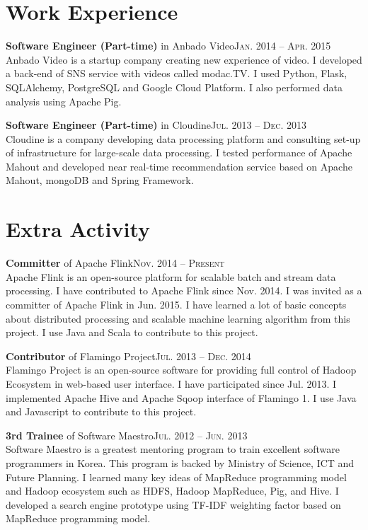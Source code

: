 \documentclass[11pt,a4paper]{article}
\renewenvironment{itemize}{
  \begin{list}{}{
    \setlength{\leftmargin}{1.5em}
    \setlength{\itemsep}{0.5em}
    \setlength{\parskip}{0pt}
    \setlength{\parsep}{0.25em}
  }
}{
  \end{list}
}
\begin{document}
\section*{Work Experience}
\begin{itemize}
  \item \textbf{Software Engineer (Part-time)} in Anbado Video\hfill\textsc{Jan. 2014 -- Apr. 2015}\\
        Anbado Video is a startup company creating new experience of video. I developed a back-end of SNS service with videos called modac.TV. I used Python, Flask, SQLAlchemy, PostgreSQL and Google Cloud Platform. I also performed data analysis using Apache Pig.
  \item \textbf{Software Engineer (Part-time)} in Cloudine\hfill\textsc{Jul. 2013 -- Dec. 2013}\\
        Cloudine is a company developing data processing platform and consulting set-up of infrastructure for large-scale data processing. I tested performance of Apache Mahout and developed near real-time recommendation service based on Apache Mahout, mongoDB and Spring Framework.
\end{itemize}

\section*{Extra Activity}
\begin{itemize}
  \item \textbf{Committer} of Apache Flink\hfill\textsc{Nov. 2014 -- Present}\\
        Apache Flink is an open-source platform for scalable batch and stream data processing. I have contributed to Apache Flink since Nov. 2014. I was invited as a committer of Apache Flink in Jun. 2015. I have learned a lot of basic concepts about distributed processing and scalable machine learning algorithm from this project. I use Java and Scala to contribute to this project.
  \item \textbf{Contributor} of Flamingo Project\hfill\textsc{Jul. 2013 -- Dec. 2014}\\
        Flamingo Project is an open-source software for providing full control of Hadoop Ecosystem in web-based user interface. I have participated since Jul. 2013. I implemented Apache Hive and Apache Sqoop interface of Flamingo 1. I use Java and Javascript to contribute to this project.
  \item \textbf{3rd Trainee} of Software Maestro\hfill\textsc{Jul. 2012 -- Jun. 2013}\\
        Software Maestro is a greatest mentoring program to train excellent software programmers in Korea. This program is backed by Ministry of Science, ICT and Future Planning. I learned many key ideas of MapReduce programming model and Hadoop ecosystem such as HDFS, Hadoop MapReduce, Pig, and Hive. I developed a search engine prototype using TF-IDF weighting factor based on MapReduce programming model.
\end{itemize}
\end{document}
